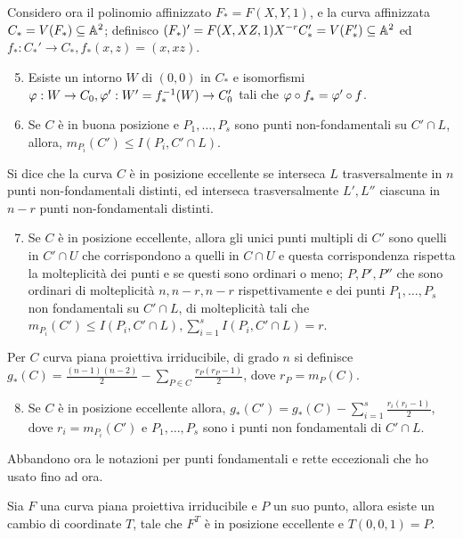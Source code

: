     Considero ora il polinomio affinizzato $F_* = F(X,Y,1)$, e la curva affinizzata $C_* = V(F_*) \subseteq \mathbb{A}^2$; definisco $(F_*)' = F(X,XZ,1)X^{-r} C_*' = V(F_*') \subseteq \mathbb{A}^2$ ed $f_* : C_*' \to C_*, f_*(x,z) = (x,xz)$.
    \begin{enumerate} \setcounter{enumi}{4}
        \item Esiste un intorno $W$ di $(0,0)$ in $C_*$ e isomorfismi $\varphi : W \to C_0, \varphi' : W' = f_*^{-1}(W) \to C_0'$ tali che $\varphi \circ f_* = \varphi' \circ f$.
        \item Se $C$ è in buona posizione e $P_1,\ldots,P_s$ sono punti non-fondamentali su $C' \cap L$, allora, $m_{P_i}(C') \leq I(P_i,C' \cap L)$. \\
    \end{enumerate}
    Si dice che la curva $C$ è in posizione eccellente se interseca $L$ trasversalmente in $n$ punti non-fondamentali distinti, ed interseca trasversalmente $L',L''$ ciascuna in $n-r$ punti non-fondamentali distinti.
    \begin{enumerate} \setcounter{enumi}{6}
        \item Se $C$ è in posizione eccellente, allora gli unici punti multipli di $C'$ sono quelli in $C' \cap U$ che corrispondono a quelli in $C \cap U$ e questa corrispondenza rispetta la molteplicità dei punti e se questi sono ordinari o meno; $P,P',P''$ che sono ordinari di molteplicità 
        $n,n-r,n-r$ rispettivamente e dei punti $P_1,\ldots,P_s$ non fondamentali su $C' \cap L$, di molteplicità tali che $m_{P_i}(C') \leq I(P_i,C'\cap L), \sum_{i=1}^s I(P_i,C'\cap L) = r$.\\
    \end{enumerate}
    Per $C$ curva piana proiettiva irriducibile, di grado $n$ si definisce $g_*(C) = \frac{(n-1)(n-2)}{2} - \sum_{P \in C}\frac{r_P(r_P-1)}{2}$, dove $r_P = m_P(C)$. \begin{enumerate} \setcounter{enumi}{7}
        \item Se $C$ è in posizione eccellente allora, $g_*(C') = g_*(C)-\sum_{i=1}^s\frac{r_i(r_i-1)}{2}$, dove $r_i = m_{P_i}(C')$ e $P_1,\ldots,P_s$ sono i punti non fondamentali di $C' \cap L$.
    \end{enumerate}
    Abbandono ora le notazioni per punti fondamentali e rette eccezionali che ho usato fino ad ora.
    \begin{lemma}
        Sia $F$ una curva piana proiettiva irriducibile e $P$ un suo punto, allora esiste un cambio di coordinate $T$, tale che $F^T$ è in posizione eccellente e $T(0,0,1) = P$.
    \end{lemma}
